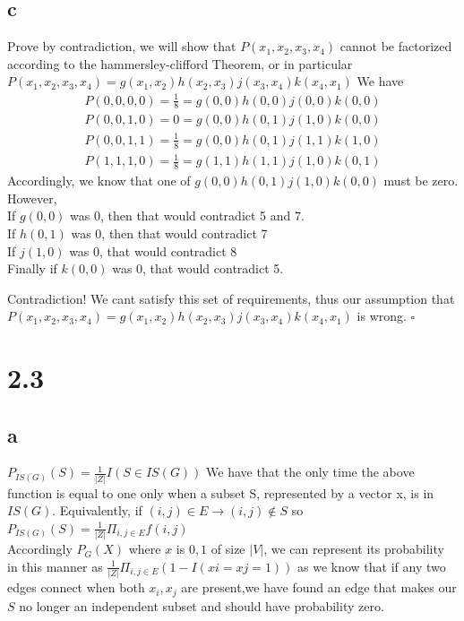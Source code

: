 \documentclass[12pt]{article}
\begin{document}
	\subsection{c}
	Prove by contradiction, we will show that $P(x_1,x_2,x_3,x_4)$ cannot be factorized according to the hammersley-clifford Theorem, or in particular\\
	$P(x_1,x_2,x_3,x_4) = g(x_1,x_2)h(x_2,x_3)j(x_3,x_4)k(x_4,x_1)$
	We have 
	\begin{gather}
	P(0,0,0,0) = \frac{1}{8} = g(0,0)h(0,0)j(0,0)k(0,0)\\
	P(0,0,1,0) = 0 = g(0,0)h(0,1)j(1,0)k(0,0)\\
	P(0,0,1,1) = \frac{1}{8} = g(0,0)h(0,1)j(1,1)k(1,0)\\
	P(1,1,1,0) = \frac{1}{8} = g(1,1)h(1,1)j(1,0)k(0,1)
	\end{gather}
	Accordingly, we know that one of $g(0,0)h(0,1)j(1,0)k(0,0)$ must be zero.\\
	However,
	\\
	If $g(0,0)$ was 0, then that would contradict 5 and 7. 
	\\
	If $h(0,1)$ was 0, then that would contradict 7
	\\
	If $j(1,0)$ was 0, that would contradict 8
	\\
	Finally if $k(0,0)$ was 0, that would contradict 5.
	
	Contradiction! We cant satisfy this set of requirements, thus our assumption that $P(x_1,x_2,x_3,x_4) = g(x_1,x_2)h(x_2,x_3)j(x_3,x_4)k(x_4,x_1)$ is wrong. $\square$

\section{2.3}
\subsection{a}
$P_{IS(G)}(S) = \frac{1}{\vert Z \vert}I(S\in IS(G))$
We have that the only time the above function is equal to one only when a subset S, represented by a vector x, is in $IS(G)$. Equivalently, if $(i,j)\in E \rightarrow (i,j) \notin S$ so $P_{IS(G)}(S) = \frac{1}{\vert Z \vert}\Pi_{i,j\in E}f(i,j)$
\\
Accordingly $P_G(X)$ where $x$ is ${0,1}$ of size $\lvert V \lvert$, we can represent its probability in this manner as $\frac{1}{\vert Z \vert}\Pi_{i,j\in E}(1-I(xi=xj=1))$ as we know that if any two edges connect when both $x_i,x_j$ are present,we have found an edge that makes our $S$ no longer an independent subset and should have probability zero.
\end{document}
